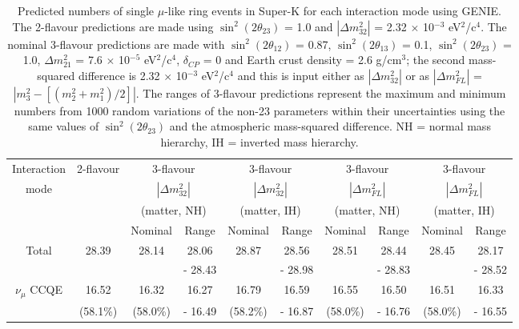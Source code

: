\begin{table}
\caption[Predicted numbers of single $\mu$-like ring events in Super-K for each interaction mode using GENIE]
{Predicted numbers of single $\mu$-like ring events in Super-K for each interaction mode using GENIE. The 2-flavour predictions are made using 
$\sin^{2}(2 \theta_{23})$ = 1.0 and $|\Delta m_{32}^{2}|$ = 2.32 $\times$ 10$^{-3}$ eV$^{2}$/c$^{4}$. The nominal 3-flavour predictions are made with 
$\sin^{2}(2 \theta_{12})$ = 0.87, $\sin^{2}(2 \theta_{13})$ = 0.1, $\sin^{2}(2 \theta_{23})$ = 1.0, $\Delta m_{21}^{2}$ = 7.6 $\times$ 10$^{-5}$ eV$^{2}$/c$^{4}$, 
$\delta_{CP}$ = 0 and Earth crust density = 2.6 g/cm$^{3}$; the second mass-squared difference is 2.32 $\times$ 10$^{-3}$ eV$^{2}$/c$^{4}$ and this is input either 
as $|\Delta m_{32}^{2}|$ or as $|\Delta m_{FL}^{2}|$ = $|m_{3}^{2} - [(m_{2}^{2} + m_{1}^{2}) / 2]|$. The ranges of 3-flavour predictions represent the 
maximum and minimum numbers from 1000 random variations of the non-23 parameters within their uncertainties using the same values of $\sin^{2}(2 \theta_{23})$ 
and the atmospheric mass-squared difference. NH = normal mass hierarchy, IH = inverted mass hierarchy.}
\renewcommand{\tabcolsep}{3.5pt}
\centering
\begin{tabular}{| c | c | c | c | c | c | c | c | c | c |}
\hline
Interaction &  2-flavour & \multicolumn{2}{|c|}{3-flavour} & \multicolumn{2}{|c|}{3-flavour} & \multicolumn{2}{|c|}{3-flavour} & \multicolumn{2}{|c|}{3-flavour} \\
mode &  & \multicolumn{2}{|c|}{$|\Delta m_{32}^{2}|$} & \multicolumn{2}{|c|}{$|\Delta m_{32}^{2}|$} & \multicolumn{2}{|c|}{$|\Delta m_{FL}^{2}|$} & \multicolumn{2}{|c|}{$|\Delta m_{FL}^{2}|$} \\
 &  & \multicolumn{2}{|c|}{(matter, NH)} & \multicolumn{2}{|c|}{(matter, IH)} & \multicolumn{2}{|c|}{(matter, NH)} & \multicolumn{2}{|c|}{(matter, IH)} \\
\hline
 &   & Nominal & Range & Nominal & Range & Nominal & Range & Nominal & Range \\
\hline
Total &  28.39 & 28.14 & 28.06 & 28.87 & 28.56 & 28.51 & 28.44 & 28.45 & 28.17 \\
 &  &  & - 28.43  &  & - 28.98 &  & - 28.83 &  & - 28.52 \\
\hline
$\nu_{\mu}$ CCQE &  16.52 & 16.32 & 16.27 & 16.79 & 16.59 & 16.55 & 16.50 & 16.51 & 16.33 \\
 &  (58.1\%) & (58.0\%) & - 16.49 & (58.2\%) & - 16.87 & (58.0\%) & - 16.76 & (58.0\%) & - 16.55 \\

\end{tabular}
\end{table}
